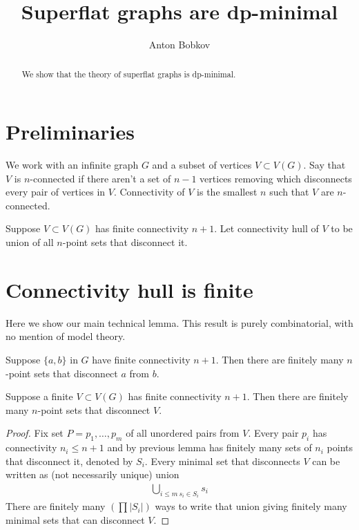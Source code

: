 \documentclass{amsart}
\begin{document}
\title{Superflat graphs are dp-minimal}
\author{Anton Bobkov}

\begin{abstract}
	We show that the theory of superflat graphs is dp-minimal.
\end{abstract}

\maketitle

\section{Preliminaries}

We work with an infinite graph $G$ and a subset of vertices $V \subset V(G)$. Say that $V$ is $n$-connected if there aren't a set of $n-1$ vertices removing which disconnects every pair of vertices in $V$. Connectivity of $V$ is the smallest $n$ such that $V$ are $n$-connected.

\begin{Definition}
	Suppose $V \subset V(G)$ has finite connectivity $n+1$. Let connectivity hull of $V$ to be union of all $n$-point sets that disconnect it.
\end{Definition}

\section{Connectivity hull is finite}

Here we show our main technical lemma. This result is purely combinatorial, with no mention of model theory.

\begin{Lemma}
	Suppose $\{a,b\}$ in $G$ have finite connectivity $n+1$. Then there are finitely many $n$-point sets that disconnect $a$ from $b$.
\end{Lemma}

\begin{Corollary}
	Suppose a finite $V \subset V(G)$ has finite connectivity $n+1$. Then there are finitely many $n$-point sets that disconnect $V$.
\end{Corollary}

\begin{proof}
	Fix set $P = {p_1, \ldots, p_m}$ of all unordered pairs from $V$. Every pair $p_i$ has connectivity $n_i \leq n + 1$ and by previous lemma has finitely many sets of $n_i$ points that disconnect it, denoted by $S_i$. Every minimal set that disconnects $V$ can be written as (not necessarily unique) union
	\begin{align*}
		\bigcup_{i \leq m \ s_i \in S_i} s_i 
	\end{align*}
	There are finitely many $(\prod |S_i|)$ ways to write that union giving finitely many minimal sets that can disconnect $V$.
\end{proof}
\end{document}
